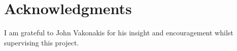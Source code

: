 \documentclass[fleqn,10pt]{article} %
\begin{document}
\section*{Acknowledgments}

I am grateful to John Vakonakis for his insight and encouragement whilst supervising this project.





\end{document}
